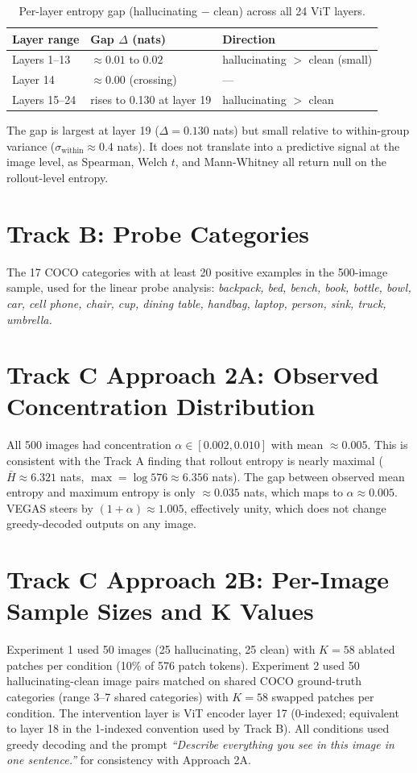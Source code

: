 \documentclass[11pt]{article}
\begin{document}
\begin{table}[h]
\centering
\small
\caption{Per-layer entropy gap (hallucinating $-$ clean) across all 24 ViT layers.}
\label{tab:perlayer}
\begin{tabular}{lll}
\toprule
Layer range & Gap $\Delta$ (nats) & Direction \\
\midrule
Layers 1--13   & $\approx 0.01$ to $0.02$    & hallucinating $>$ clean (small) \\
Layer 14       & $\approx 0.00$ (crossing)   & --- \\
Layers 15--24  & rises to 0.130 at layer 19  & hallucinating $>$ clean \\
\bottomrule
\end{tabular}
\end{table}

The gap is largest at layer 19 ($\Delta = 0.130$ nats) but small relative to
within-group variance ($\sigma_{\mathrm{within}} \approx 0.4$ nats). It does not
translate into a predictive signal at the image level, as Spearman, Welch $t$, and
Mann-Whitney all return null on the rollout-level entropy.

\section{Track B: Probe Categories}

The 17 COCO categories with at least 20 positive examples in the 500-image sample, used
for the linear probe analysis: \textit{backpack, bed, bench, book, bottle, bowl, car,
cell phone, chair, cup, dining table, handbag, laptop, person, sink, truck, umbrella.}

\section{Track C Approach 2A: Observed Concentration Distribution}

All 500 images had concentration $\alpha \in [0.002, 0.010]$ with mean $\approx 0.005$.
This is consistent with the Track A finding that rollout entropy is nearly maximal
($\bar{H} \approx 6.321$ nats, $\max = \log 576 \approx 6.356$ nats). The gap between
observed mean entropy and maximum entropy is only $\approx 0.035$ nats, which maps to
$\alpha \approx 0.005$. VEGAS steers by $(1 + \alpha) \approx 1.005$, effectively
unity, which does not change greedy-decoded outputs on any image.

\section{Track C Approach 2B: Per-Image Sample Sizes and K Values}

Experiment 1 used 50 images (25 hallucinating, 25 clean) with $K = 58$ ablated patches
per condition (10\% of 576 patch tokens). Experiment 2 used 50 hallucinating-clean
image pairs matched on shared COCO ground-truth categories (range 3--7 shared
categories) with $K = 58$ swapped patches per condition. The intervention layer is ViT
encoder layer 17 (0-indexed; equivalent to layer 18 in the 1-indexed convention used by
Track B). All conditions used greedy decoding and the prompt \textit{``Describe
everything you see in this image in one sentence.''} for consistency with Approach 2A.
\end{document}
